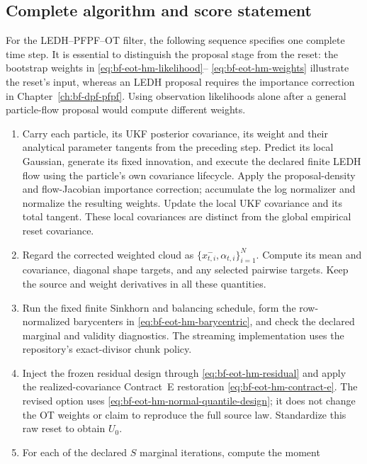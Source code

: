 \subsection{Complete algorithm and score statement}

For the LEDH--PFPF--OT filter, the following sequence specifies one complete
time step.  It is essential to distinguish the proposal stage from the reset:
the bootstrap weights in \eqref{eq:bf-eot-hm-likelihood}--
\eqref{eq:bf-eot-hm-weights} illustrate the reset's input, whereas an LEDH
proposal requires the importance correction in Chapter~\ref{ch:bf-dpf-pfpf}.
Using observation likelihoods alone after a general particle-flow proposal
would compute different weights.
\begin{enumerate}[label=(\arabic*)]
 \item Carry each particle, its UKF posterior covariance, its weight and their
       analytical parameter tangents from the preceding step.  Predict its
       local Gaussian, generate its fixed innovation, and execute the declared
       finite LEDH flow using the particle's own covariance lifecycle.
       Apply the proposal-density and flow-Jacobian importance correction;
       accumulate the log normalizer and normalize the resulting weights.
       Update the local UKF covariance and its total tangent.  These local
       covariances are distinct from the global empirical reset covariance.
 \item Regard the corrected weighted cloud as
       \(\{x_{t,i}^{-},\alpha_{t,i}\}_{i=1}^N\).  Compute its mean and
       covariance, diagonal shape targets, and any selected pairwise targets.
       Keep the source and weight derivatives in all these quantities.
 \item Run the fixed finite Sinkhorn and balancing schedule, form the
       row-normalized barycenters in \eqref{eq:bf-eot-hm-barycentric}, and check
       the declared marginal and validity diagnostics.  The streaming
       implementation uses the repository's exact-divisor chunk policy.
 \item Inject the frozen residual design through
       \eqref{eq:bf-eot-hm-residual} and apply the realized-covariance
       Contract~E restoration \eqref{eq:bf-eot-hm-contract-e}.  The revised
       option uses \eqref{eq:bf-eot-hm-normal-quantile-design}; it does not
       change the OT weights or claim to reproduce the full source law.
       Standardize this raw reset to obtain \(U_0\).
 \item For each of the declared \(S\) marginal iterations, compute the moment

\end{enumerate}
